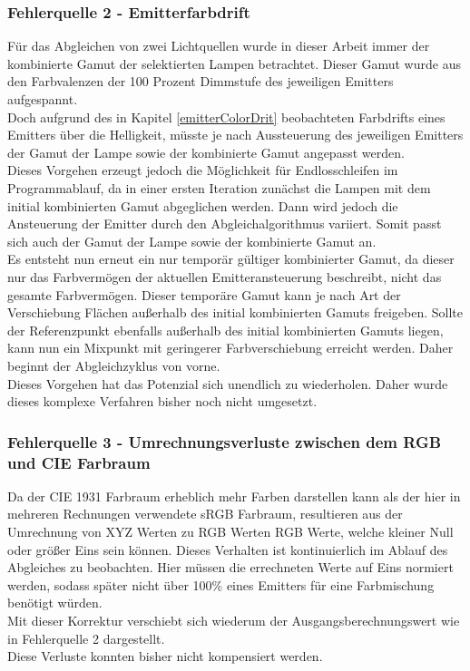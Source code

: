 \documentclass[11pt]{scrartcl}
\begin{document}
\subsubsection{Fehlerquelle 2 - Emitterfarbdrift}
Für das Abgleichen von zwei Lichtquellen wurde in dieser Arbeit immer der kombinierte Gamut der selektierten Lampen
betrachtet. Dieser Gamut wurde aus den Farbvalenzen der 100 Prozent Dimmstufe des jeweiligen Emitters aufgespannt.\\
Doch aufgrund des in Kapitel \ref{emitterColorDrit} beobachteten Farbdrifts eines Emitters über die Helligkeit, müsste
je nach Aussteuerung des jeweiligen Emitters der Gamut der Lampe sowie der kombinierte Gamut angepasst werden.\\
Dieses Vorgehen erzeugt jedoch die Möglichkeit für Endlosschleifen im Programmablauf, da in einer ersten Iteration
zunächst die Lampen mit dem initial kombinierten Gamut abgeglichen werden. Dann wird jedoch die Ansteuerung der Emitter
durch den Abgleichalgorithmus variiert. Somit passt sich auch der Gamut der Lampe sowie der kombinierte Gamut an.\\
Es entsteht nun erneut ein nur temporär gültiger kombinierter Gamut, da dieser nur das Farbvermögen der aktuellen
Emitteransteuerung beschreibt, nicht das gesamte Farbvermögen. Dieser temporäre Gamut kann je nach Art der Verschiebung
Flächen außerhalb des initial kombinierten Gamuts freigeben. Sollte der Referenzpunkt ebenfalls außerhalb des
initial kombinierten Gamuts liegen, kann nun ein Mixpunkt mit geringerer Farbverschiebung erreicht werden. Daher
beginnt der Abgleichzyklus von vorne.\\
Dieses Vorgehen hat das Potenzial sich unendlich zu wiederholen. Daher wurde dieses komplexe Verfahren bisher noch
nicht umgesetzt.
\subsubsection{Fehlerquelle 3 - Umrechnungsverluste zwischen dem RGB und CIE Farbraum}
Da der CIE 1931 Farbraum erheblich mehr Farben darstellen kann als der hier in mehreren Rechnungen verwendete sRGB Farbraum,
resultieren aus der Umrechnung von XYZ Werten zu RGB Werten RGB Werte, welche kleiner Null oder größer Eins sein können.
Dieses Verhalten ist kontinuierlich im Ablauf des Abgleiches zu beobachten. Hier müssen die errechneten Werte auf Eins
normiert werden, sodass später nicht über 100\% eines Emitters für eine Farbmischung benötigt würden.\\
Mit dieser Korrektur verschiebt sich wiederum der Ausgangsberechnungswert wie in Fehlerquelle 2 dargestellt.\\
Diese Verluste konnten bisher nicht kompensiert werden.
\end{document}
